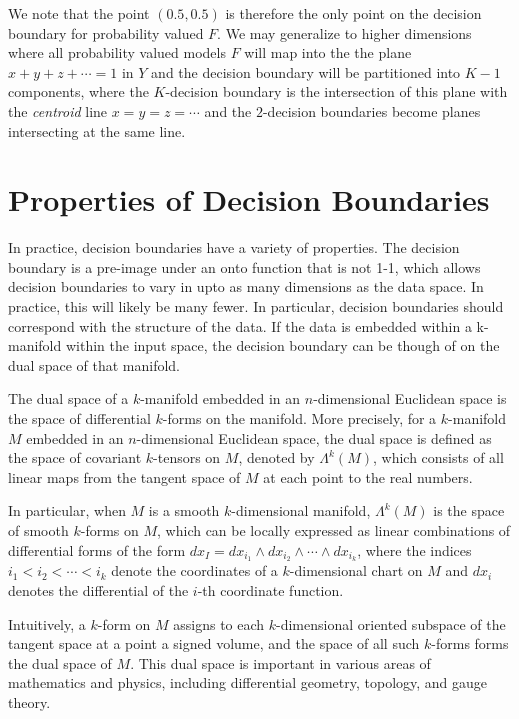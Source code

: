 We note that the point $(0.5, 0.5)$ is therefore the only point on the decision boundary for probability valued $F$. We may generalize to higher dimensions where all probability valued models $F$ will map into the the plane $x + y + z + \cdots = 1$ in $Y$ and the decision boundary will be partitioned into $K-1$ components, where the $K$-decision boundary is the intersection of this plane with the \emph{centroid} line $x = y = z = \cdots$ and the $2$-decision boundaries become planes intersecting at the same line. 

\section{Properties of Decision Boundaries}

In practice, decision boundaries have a variety of properties. The
decision boundary is a pre-image under an onto function that is not
1-1, which allows decision boundaries to vary in upto as many
dimensions as the data space. In practice, this will likely be many
fewer. In particular, decision boundaries should correspond with the
structure of the data. If the data is embedded within a k-manifold
within the input space, the decision boundary can be though of on the
dual space of that manifold.

The dual space of a $k$-manifold embedded in an $n$-dimensional Euclidean space is the space of differential $k$-forms on the manifold. More precisely, for a $k$-manifold $M$ embedded in an $n$-dimensional Euclidean space, the dual space is defined as the space of covariant $k$-tensors on $M$, denoted by $\Lambda^k(M)$, which consists of all linear maps from the tangent space of $M$ at each point to the real numbers.

In particular, when $M$ is a smooth $k$-dimensional manifold, $\Lambda^k(M)$ is the space of smooth $k$-forms on $M$, which can be locally expressed as linear combinations of differential forms of the form $dx_I = dx_{i_1} \wedge dx_{i_2} \wedge \cdots \wedge dx_{i_k}$, where the indices $i_1 < i_2 < \cdots < i_k$ denote the coordinates of a $k$-dimensional chart on $M$ and $dx_i$ denotes the differential of the $i$-th coordinate function.

Intuitively, a $k$-form on $M$ assigns to each $k$-dimensional oriented subspace of the tangent space at a point a signed volume, and the space of all such $k$-forms forms the dual space of $M$. This dual space is important in various areas of mathematics and physics, including differential geometry, topology, and gauge theory.

